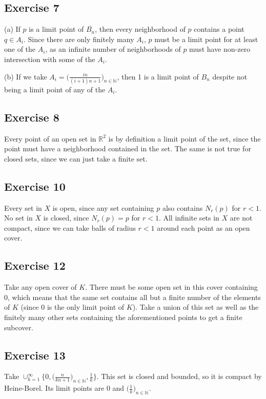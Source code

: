 \subsection{Exercise 7}
(a) If $p$ is a limit point of $\overline{B_n}$, then every neighborhood
of $p$ contains a point $q \in A_i$. Since there are only finitely many $A_i$,
$p$ must be a limit point for at least one of the $A_i$, as an infinite number
of neighborhoods of $p$ must have non-zero intersection with some of the $A_i$.

(b) If we take $A_i = \big(\frac{i n}{(i + 1)n+1}\big)_{n \in \mathbb{N}}$, then
1 is a limit point of $B_n$ despite not being a limit point of any of the $A_i$.

\subsection{Exercise 8}
Every point of an open set in $\mathbb{R}^2$ is by definition a limit point of
the set, since the point must have a neighborhood contained in the set. The same
is not true for closed sets, since we can just take a finite set.

\subsection{Exercise 10}
Every set in $X$ is open, since any set containing $p$ also contains $N_r(p)$ for $r < 1$.
No set in $X$ is closed, since $N_r(p) = p$ for $r < 1$. All infinite sets in $X$ are not
compact, since we can take balls of radius $r < 1$ around each point as an open cover.

\subsection{Exercise 12}
Take any open cover of $K$. There must be some open set in this cover containing 0,
which means that the same set contains all but a finite number of the elements of $K$ 
(since 0 is the only limit point of $K $). Take a union of this set as well as the finitely
many other sets containing the aforementioned points to get a finite subcover.

\subsection{Exercise 13}
Take $\cup_{k = 1}^\infty \{0, \big(\frac{n}{kn+1}\big)_{n \in \mathbb{N}}, \frac{1}{k}\}$.
This set is closed and bounded, so it is compact by Heine-Borel. Its limit points
are 0 and $\big(\frac{1}{k}\big)_{n \in \mathbb{N}}$.

